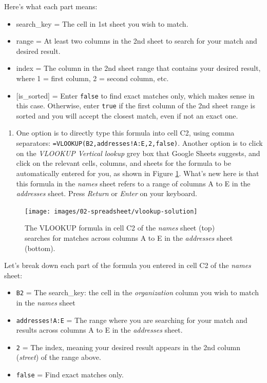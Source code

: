 \documentclass[
  english,
]{book}
\providecommand{\tightlist}{%
  \setlength{\itemsep}{0pt}\setlength{\parskip}{0pt}}
\begin{document}
Here's what each part means:

\begin{itemize}
\tightlist
\item
  search\_key = The cell in 1st sheet you wish to match.
\item
  range = At least two columns in the 2nd sheet to search for your match and desired result.
\item
  index = The column in the 2nd sheet range that contains your desired result, where 1 = first column, 2 = second column, etc.
\item
  {[}is\_sorted{]} = Enter \texttt{false} to find exact matches only, which makes sense in this case. Otherwise, enter \texttt{true} if the first column of the 2nd sheet range is sorted and you will accept the closest match, even if not an exact one.
\end{itemize}

\begin{enumerate}
\def\labelenumi{\arabic{enumi}.}
\setcounter{enumi}{3}
\tightlist
\item
  One option is to directly type this formula into cell C2, using comma separators: \texttt{=VLOOKUP(B2,\textquotesingle{}addresses\textquotesingle{}!A:E,2,false)}. Another option is to click on the \emph{VLOOKUP Vertical lookup} grey box that Google Sheets suggests, and click on the relevant cells, columns, and sheets for the formula to be automatically entered for you, as shown in Figure \ref{fig:vlookup-solution}. What's new here is that this formula in the \emph{names} sheet refers to a range of columns A to E in the \emph{addresses} sheet. Press \emph{Return} or \emph{Enter} on your keyboard.
\end{enumerate}



\begin{figure}
\texttt{[image: images/02-spreadsheet/vlookup-solution]} \caption{The VLOOKUP formula in cell C2 of the \emph{names} sheet (top) searches for matches across columns A to E in the \emph{addresses} sheet (bottom).}\label{fig:vlookup-solution}
\end{figure}

Let's break down each part of the formula you entered in cell C2 of the \emph{names} sheet:

\begin{itemize}
\tightlist
\item
  \texttt{B2} = The search\_key: the cell in the \emph{organization} column you wish to match in the \emph{names} sheet
\item
  \texttt{\textquotesingle{}addresses\textquotesingle{}!A:E} = The range where you are searching for your match and results across columns A to E in the \emph{addresses} sheet.
\item
  \texttt{2} = The index, meaning your desired result appears in the 2nd column (\emph{street}) of the range above.
\item
  \texttt{false} = Find exact matches only.
\end{itemize}
\end{document}
